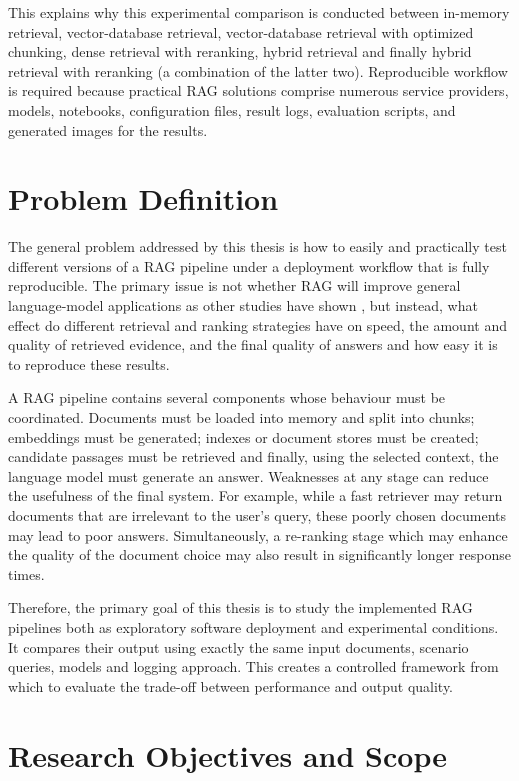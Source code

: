 This explains why this experimental comparison is conducted between in-memory retrieval, vector-database retrieval, vector-database retrieval with optimized chunking, dense retrieval with reranking, hybrid retrieval and finally hybrid retrieval with reranking (a combination of the latter two). Reproducible workflow is required because practical \ac{RAG} solutions comprise numerous service providers, models, notebooks, configuration files, result logs, evaluation scripts, and generated images for the results.

\section{Problem Definition}

The general problem addressed by this thesis is how to easily and practically test different versions of a \ac{RAG} pipeline under a deployment workflow that is fully reproducible. The primary issue is not whether \ac{RAG} will improve general language-model applications as other studies have shown \cite{lewis2020rag,izacard2021leveraging}, but instead, what effect do different retrieval and ranking strategies have on speed, the amount and quality of retrieved evidence, and the final quality of answers and how easy it is to reproduce these results.

A \ac{RAG} pipeline contains several components whose behaviour must be coordinated. Documents must be loaded into memory and split into chunks; embeddings must be generated; indexes or document stores must be created; candidate passages must be retrieved and finally, using the selected context, the language model must generate an answer. Weaknesses at any stage can reduce the usefulness of the final system. For example, while a fast retriever may return documents that are irrelevant to the user's query, these poorly chosen documents may lead to poor answers. Simultaneously, a re-ranking stage which may enhance the quality of the document choice may also result in significantly longer response times.

Therefore, the primary goal of this thesis is to study the implemented \ac{RAG} pipelines both as exploratory software deployment and experimental conditions. It compares their output using exactly the same input documents, scenario queries, models and logging approach. This creates a controlled framework from which to evaluate the trade-off between performance and output quality.

\section{Research Objectives and Scope}

